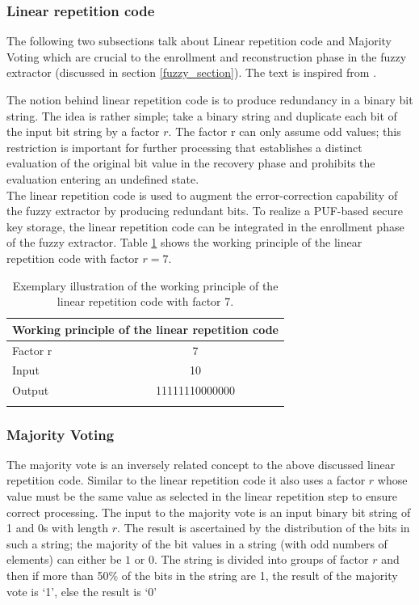 \subsubsection{Linear repetition code}
\label{fzex_lr}
The following two subsections talk about Linear repetition code and Majority Voting which are crucial to the enrollment and reconstruction phase in the fuzzy extractor (discussed in section \ref{fuzzy_section}). The text is inspired from \cite{71}.

The notion behind linear repetition code is to produce redundancy in a binary bit string. The idea is rather simple; take a binary string and duplicate each bit of the input bit string by a factor $r$. The factor r can only assume odd values; this restriction is important for further processing that establishes a distinct evaluation of the original bit value in the recovery phase and prohibits the evaluation entering an undefined state.\\

The linear repetition code is used to augment the error-correction capability of the fuzzy extractor by producing redundant bits. To realize a PUF-based secure key storage, the linear repetition code can be integrated in the enrollment phase of the fuzzy extractor. Table \ref{lr} shows the working principle of the linear repetition code with factor $r = 7$.

\begin{table}[!ht]
\begin{center}
\begin{tabular}{lc}
\toprule
\multicolumn{2}{c}{\textbf{Working principle of the linear repetition code}}\\
\midrule
Factor r & 7\\
Input & 10\\
Output & 11111110000000\\
\addlinespace
\bottomrule
\end{tabular}
\end{center}
\caption{Exemplary illustration of the working principle of the linear repetition code with factor 7.}
\label{lr}
\end{table}

\subsubsection{Majority Voting}
\label{fzex_mv}
The majority vote is an inversely related concept to the above discussed linear repetition code. Similar to the linear repetition code it also uses a factor $r$ whose value must be the same value as selected in the linear repetition step to ensure correct processing. The input to the majority vote is an input binary bit string of 1 and 0s with length $r$. The result is ascertained by the distribution of the bits in such a string; the majority of the bit values in a string (with odd numbers of elements) can either be $1$ or $0$. The string is divided into groups of factor $r$ and then if more than 50\% of the bits in the string are 1, the result of the majority vote is `1', else the result is `0'\\

